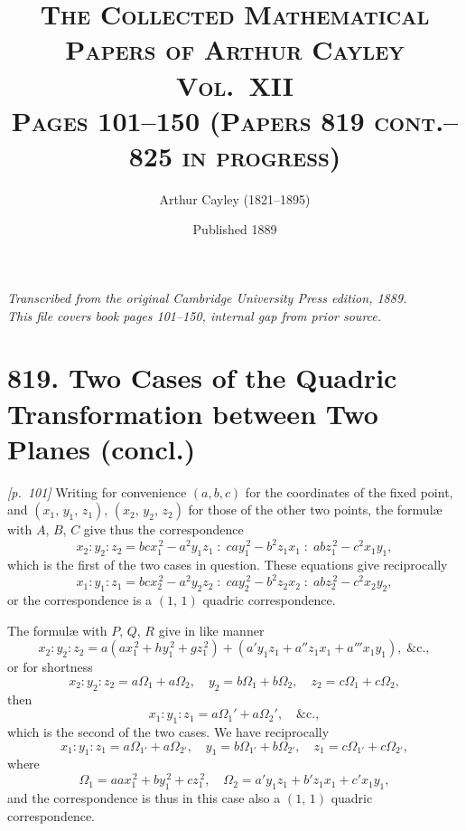 \documentclass[11pt,a4paper]{book}
\begin{document}
\title{\scshape The Collected Mathematical Papers of Arthur Cayley\\Vol.\ XII\\[0.5em]\large Pages 101--150 (Papers 819 cont.--825 in progress)}
\author{Arthur Cayley (1821--1895)}
\date{Published 1889}


\thispagestyle{empty}
\begin{center}
\textit{Transcribed from the original Cambridge University Press edition, 1889.}\\
\textit{This file covers book pages 101--150, internal gap from prior source.}
\end{center}


\newpage

\section*{819. Two Cases of the Quadric Transformation between Two Planes (concl.)}

\noindent\textit{[p.~101]} Writing for convenience $(a, b, c)$ for the coordinates of the fixed point, and $(x_1,\,y_1,\,z_1)$, $(x_2,\,y_2,\,z_2)$ for those of the other two points, the formul\ae{} with $A$, $B$, $C$ give thus the correspondence
\[
x_2 : y_2 : z_2 = bcx_1^{\,2} - a^2y_1z_1 \;:\; ca y_1^{\,2} - b^2 z_1 x_1 \;:\; ab z_1^{\,2} - c^2 x_1 y_1,
\]
which is the first of the two cases in question. These equations give reciprocally
\[
x_1 : y_1 : z_1 = b c x_2^{\,2} - a^2 y_2 z_2 \;:\; c a y_2^{\,2} - b^2 z_2 x_2 \;:\; a b z_2^{\,2} - c^2 x_2 y_2,
\]
or the correspondence is a $(1,\,1)$ quadric correspondence.

The formul\ae{} with $P$, $Q$, $R$ give in like manner
\[
x_2 : y_2 : z_2 = a(a x_1^{\,2} + h y_1^{\,2} + g z_1^{\,2}) + (a' y_1 z_1 + a'' z_1 x_1 + a''' x_1 y_1),\;\&\text{c.},
\]
or for shortness
\[
x_2 : y_2 : z_2 = a\Omega_1 + a\Omega_2,\quad y_2 = b\Omega_1 + b\Omega_2,\quad z_2 = c\Omega_1 + c\Omega_2,
\]
then
\[
x_1 : y_1 : z_1 = a\Omega_1' + a\Omega_2',\quad \&\text{c.},
\]
which is the second of the two cases. We have reciprocally
\[
x_1 : y_1 : z_1 = a\Omega_{1'} + a\Omega_{2'},\quad y_1 = b\Omega_{1'} + b\Omega_{2'},\quad z_1 = c\Omega_{1'} + c\Omega_{2'},
\]
where
\[
\Omega_1 = aa x_1^{\,2} + b y_1^{\,2} + c z_1^{\,2},\quad \Omega_2 = a' y_1 z_1 + b' z_1 x_1 + c' x_1 y_1,
\]
and the correspondence is thus in this case also a $(1,\,1)$ quadric correspondence.
\end{document}
